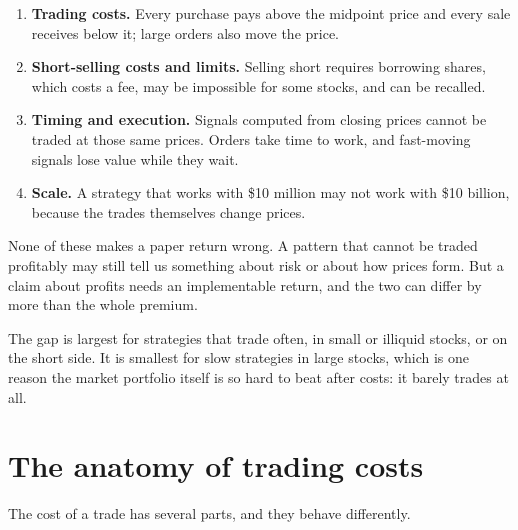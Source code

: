 \begin{enumerate}
  \item \textbf{Trading costs.} Every purchase pays above the midpoint price and every sale receives below it; large orders also move the price.
  \item \textbf{Short-selling costs and limits.} Selling short requires borrowing shares, which costs a fee, may be impossible for some stocks, and can be recalled.
  \item \textbf{Timing and execution.} Signals computed from closing prices cannot be traded at those same prices. Orders take time to work, and fast-moving signals lose value while they wait.
  \item \textbf{Scale.} A strategy that works with \$10 million may not work with \$10 billion, because the trades themselves change prices.
\end{enumerate}

None of these makes a paper return wrong. A pattern that cannot be traded profitably may still tell us something about risk or about how prices form. But a claim about profits needs an implementable return, and the two can differ by more than the whole premium.

The gap is largest for strategies that trade often, in small or illiquid stocks, or on the short side. It is smallest for slow strategies in large stocks, which is one reason the market portfolio itself is so hard to beat after costs: it barely trades at all.

\section{The anatomy of trading costs}
\label{sec:06-anatomy}

The cost of a trade has several parts, and they behave differently.

